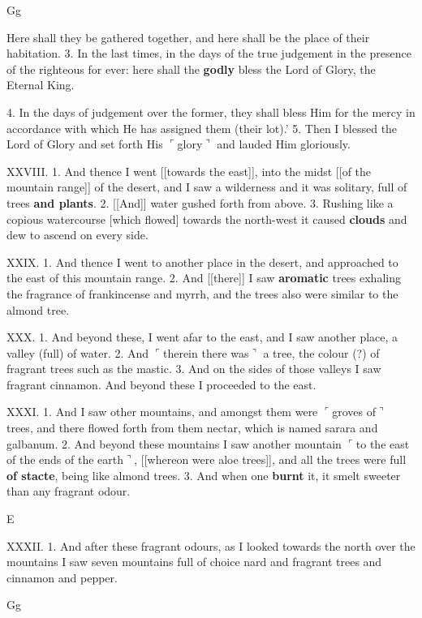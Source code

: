 Gg

Here shall they be
gathered together, and
here shall be the place of
their habitation. 3. In
the last times, in the
days of the true judgement
in the presence of
the righteous for ever:
here shall the \textbf{godly} bless
the Lord of Glory, the
Eternal King.

4. In the days of judgement over the former, they
shall bless Him for the mercy in accordance with
which He has assigned them (their lot).’ 5. Then I
blessed the Lord of Glory and set forth His $\ulcorner$glory$\urcorner$
and lauded Him gloriously.


XXVIII. 1. And thence I went [[towards the east]],
into the midst [[of the mountain range]] of the desert,
and I saw a wilderness and it was solitary, full of
trees \textbf{and plants}. 2. [[And]] water gushed forth
from above. 3. Rushing like a copious watercourse
[which flowed] towards the north-west it caused
\textbf{clouds} and dew to ascend on every side.

XXIX. 1. And thence I went to another place
in the desert, and approached to the east of this
mountain range. 2. And [[there]] I saw \textbf{aromatic}
trees exhaling the fragrance of frankincense and
myrrh, and the trees also were similar to the almond
tree.

XXX. 1. And beyond these, I went afar to the
east, and I saw another place, a valley (full) of water.
2. And $\ulcorner$therein there was$\urcorner$ a tree, the colour (?) of
fragrant trees such as the mastic. 3. And on the
sides of those valleys I saw fragrant cinnamon. And
beyond these I proceeded to the east.

XXXI. 1. And I saw other mountains, and
amongst them were $\ulcorner$groves of$\urcorner$ trees, and there
flowed forth from them nectar, which is named sarara
and galbanum. 2. And beyond these mountains
I saw another mountain $\ulcorner$to the east of the ends of
the earth$\urcorner$, [[whereon were aloe trees]], and all the
trees were full \textbf{of stacte}, being like almond trees.
3. And when one \textbf{burnt} it, it smelt sweeter than any
fragrant odour.

E

XXXII. 1. And after
these fragrant odours, as
I looked towards the
north over the mountains
I saw seven mountains
full of choice nard and
fragrant trees and cinnamon
and pepper.

Gg

